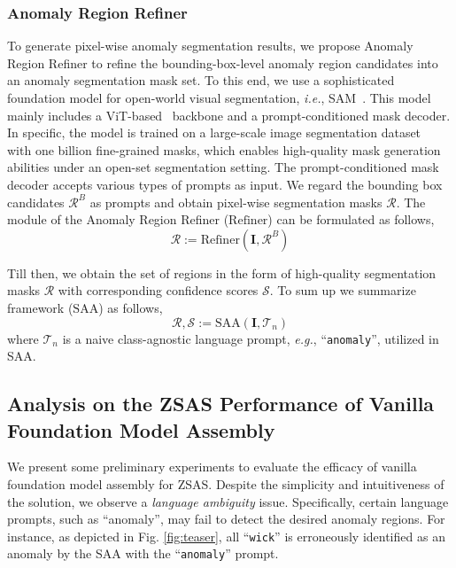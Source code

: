 \documentclass{article}
\begin{document}
\subsubsection{Anomaly Region Refiner}

To generate pixel-wise anomaly segmentation results, we propose Anomaly Region Refiner to refine the bounding-box-level anomaly region candidates into an anomaly segmentation mask set. To this end, we use a sophisticated foundation model for open-world visual segmentation, \textit{i.e.}, SAM~\cite{kirillov2023segment}. This model mainly includes a ViT-based~\cite{dosovitskiy2021an} backbone and a prompt-conditioned mask decoder. In specific, the model is trained on a large-scale image segmentation dataset~\cite{kirillov2023segment} with one billion fine-grained masks, which enables high-quality mask generation abilities under an open-set segmentation setting. The prompt-conditioned mask decoder accepts various types of prompts as input. We regard the bounding box candidates $\mathcal{R}^B$ as prompts and obtain pixel-wise segmentation masks $\mathcal{R}$. The module of the Anomaly Region Refiner ($\mathrm{Refiner}$) can be formulated as follows,
\begin{equation}
    \mathcal{R} := \mathrm{Refiner}(\mathbf{I}, \mathcal{R}^B)
\end{equation}

Till then, we obtain the set of regions in the form of high-quality segmentation masks $\mathcal{R}$ with corresponding confidence scores $\mathcal{S}$. To sum up we summarize framework ($\mathrm{SAA}$) as follows,
\begin{equation}
    \mathcal{R}, \mathcal{S} := \mathrm{SAA}(\mathbf{I}, \mathcal{T}_n)
\end{equation}
where $\mathcal{T}_n$ is a naive class-agnostic language prompt, \textit{e.g.}, ``\verb|anomaly|'', utilized in SAA. 

\subsection{Analysis on the ZSAS Performance of Vanilla Foundation Model Assembly}

We present some preliminary experiments to evaluate the efficacy of vanilla foundation model assembly for ZSAS. Despite the simplicity and intuitiveness of the solution, we observe a \textit{language ambiguity} issue. Specifically, certain language prompts, such as ``anomaly'', may fail to detect the desired anomaly regions. For instance, as depicted in Fig. \ref{fig:teaser}, all ``\verb|wick|'' is erroneously identified as an anomaly by the SAA with the ``\verb|anomaly|'' prompt. 
\end{document}
